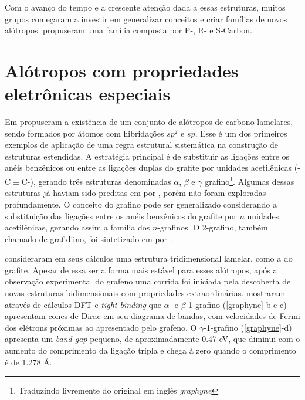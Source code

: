 		Com o avanço do tempo e a crescente atenção dada a essas estruturas, muitos grupos começaram a investir em generalizar conceitos e criar famílias de novos alótropos. \citeauthor{niu2012families} propuseram uma família composta por P-, R- e S-Carbon. 
	
	\section{Alótropos com propriedades eletrônicas especiais}
	
		Em \citeyear{baughman1987structure} \citeauthor{baughman1987structure} propuseram a existência de um conjunto de alótropos de carbono lamelares, sendo formados por átomos com hibridações $sp^2$ e $sp$. Esse é um dos primeiros exemplos de aplicação de uma regra estrutural sistemática na construção de estruturas estendidas. A estratégia principal é de substituir as ligações entre os anéis benzênicos ou entre as ligações duplas do grafite por unidades acetilênicas (-C$\equiv$C-), gerando três estruturas denominadas $\alpha$, $\beta$ e $\gamma$ grafino\footnote{Traduzindo livremente do original em inglês \textit{graphyne}}. Algumas dessas estruturas já haviam sido preditas em \citeyear{balaban1968chemical} por \citeauthor{balaban1968chemical}, porém não foram exploradas profundamente. O conceito do grafino pode ser generalizado considerando a substituição das ligações entre os anéis benzênicos do grafite por $n$ unidades acetilênicas, gerando assim a família dos $n$-grafinos. O 2-grafino, também chamado de grafidiino, foi sintetizado em \citeyear{li2010architecture} por \citeauthor{li2010architecture}.
		
		\citeauthor{baughman1987structure} consideraram em seus cálculos uma estrutura tridimensional lamelar, como a do grafite. Apesar de essa ser a forma mais estável para esses alótropos, após a observação experimental do grafeno uma corrida foi iniciada pela descoberta de novas estruturas bidimensionais com propriedades extraordinárias. \citeauthor{kim2012graphyne} mostraram através de cálculos DFT e \textit{tight-binding} que  $\alpha$- e $\beta$-1-grafino (\autoref{graphyne}-b e c) apresentam cones de Dirac em seu diagrama de bandas, com velocidades de Fermi dos elétrons próximas ao apresentado pelo grafeno. O $\gamma$-1-grafino (\autoref{graphyne}-d) apresenta um \textit{band gap} pequeno, de aproximadamente 0.47 eV, que diminui com o aumento do comprimento da ligação tripla e chega à zero quando o comprimento é de 1.278 Å.
		

